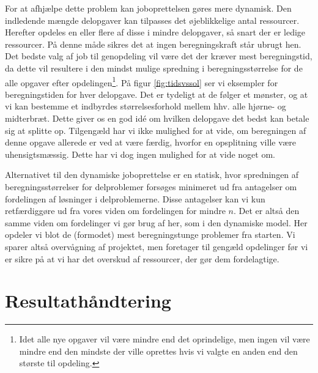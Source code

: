 \documentclass[draft,a4paper,11pt]{article}
\begin{document}
For at afhjælpe dette problem kan joboprettelsen gøres mere dynamisk. Den indledende mængde delopgaver kan tilpasses det øjeblikkelige antal ressourcer. Herefter opdeles en eller flere af disse i mindre delopgaver, så snart der er ledige ressourcer. På denne måde sikres det at ingen beregningskraft står ubrugt hen. 
Det bedste valg af job til genopdeling vil være det der kræver mest beregningstid, da dette vil resultere i den mindst mulige spredning i beregningsstørrelse for de alle opgaver efter opdelingen\footnote{Idet alle nye opgaver vil være mindre end det oprindelige, men ingen vil være mindre end den mindste der ville oprettes hvis vi valgte en anden end den største til opdeling.}. På figur \ref{fig:tidsvssol} ser vi eksempler for beregningstiden for hver delopgave. Det er tydeligt at de følger et mønster, og at vi kan bestemme et indbyrdes størrelsesforhold mellem hhv. alle hjørne- og midterbræt. Dette giver os en god idé om hvilken delopgave det bedst kan betale sig at splitte op. Tilgengæld har vi ikke mulighed for at vide, om beregningen af denne opgave allerede er ved at være færdig, hvorfor en opsplitning ville være uhensigtsmæssig. Dette har vi dog ingen mulighed for at vide noget om.

Alternativet til den dynamiske joboprettelse er en statisk, hvor spredningen af beregningsstørrelser for delproblemer forsøges minimeret ud fra antagelser om fordelingen af løsninger i delproblemerne. Disse antagelser kan vi kun retfærdiggøre ud fra vores viden om fordelingen for mindre $n$. Det er altså den samme viden om fordelinger vi gør brug af her, som i den dynamiske model. Her opdeler vi blot de (formodet) mest beregningstunge problemer fra starten. Vi sparer altså overvågning af projektet, men foretager til gengæld opdelinger før vi er sikre på at vi har det overskud af ressourcer, der gør dem fordelagtige.    




\section{Resultathåndtering}\label{resultatindsamling}
\end{document}

